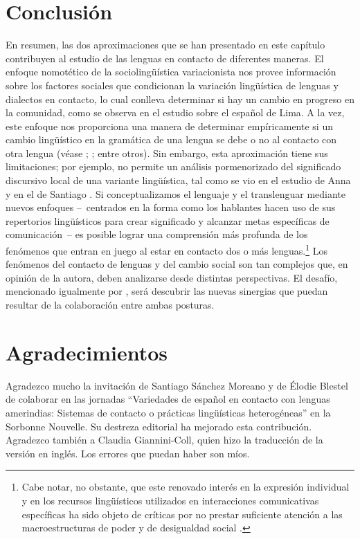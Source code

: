 \documentclass[output=paper]{langscibook}
\begin{document}
\section{Conclusión}
En resumen, las dos aproximaciones que se han presentado en este capítulo contribuyen al estudio de las lenguas en contacto de diferentes maneras. El enfoque nomotético de la sociolingüística variacionista nos provee información sobre los factores sociales que condicionan la variación lingüística de lenguas y dialectos en contacto, lo cual conlleva determinar si hay un cambio en progreso en la comunidad, como se observa en el estudio sobre el español de Lima. A la vez, este enfoque nos proporciona una manera de determinar empíricamente si un cambio lingüístico en la gramática de una lengua se debe o no al contacto con otra lengua (véase \citealt{PoplackZentzDion2012}; \citealt{Michnowicz2015};  \citealt{TorresCacoullosTravis2018} entre otros). Sin embargo, esta aproximación tiene sus limitaciones; por ejemplo, no permite un análisis pormenorizado del significado discursivo local de una variante lingüística, tal como se vio en el estudio de Anna \citet{Babel2014time} y en el de Santiago  \citet{SánchezMoreano2017}. Si conceptualizamos el lenguaje y el translenguar mediante nuevos enfoques -- centrados en la forma como los hablantes hacen uso de sus repertorios lingüísticos para crear significado y alcanzar metas específicas de comunicación -- es posible lograr una comprensión más profunda de los fenómenos que entran en juego al estar en contacto dos o más lenguas.\footnote{Cabe notar, no obstante, que este renovado interés en la expresión individual y en los recursos lingüísticos utilizados en interacciones comunicativas específicas ha sido objeto de críticas por no prestar suficiente atención a las macroestructuras de poder y de desigualdad social \citep{Mazzaferro2018}.} Los fenómenos del contacto de lenguas y del cambio social son tan complejos que, en opinión de la autora, deben analizarse desde distintas perspectivas. El desafío, mencionado igualmente por  \citet{GuyHinskens2016}, será descubrir las nuevas sinergias que puedan resultar de la colaboración entre ambas posturas.

\section*{Agradecimientos}

Agradezco mucho la invitación de Santiago Sánchez Moreano y de Élodie Blestel de colaborar en las jornadas “Variedades de español en contacto con lenguas amerindias: Sistemas de contacto o prácticas lingüísticas heterogéneas” en la Sorbonne Nouvelle. Su destreza editorial ha mejorado esta contribución. Agradezco también a Claudia Giannini-Coll, quien hizo la traducción de la versión en inglés. Los errores que puedan haber son míos.

\sloppy\printbibliography[heading=subbibliography,notkeyword=this]
\end{document}
